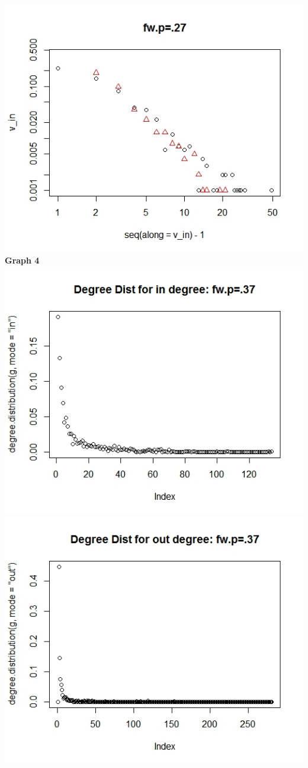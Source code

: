 \documentclass{article}
\begin{document}
\includegraphics[scale=0.4]{pd15} \\
\textbf{Graph 4}\\
\includegraphics[scale=0.4]{pd16} \\
\includegraphics[scale=0.4]{pd17} \\
\end{document}
